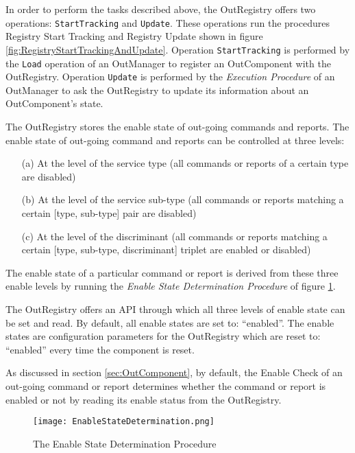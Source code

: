 In order to perform the tasks described above, the OutRegistry offers two operations: \texttt{StartTracking} and \texttt{Update}. These operations run the procedures Registry Start Tracking and Registry Update shown in figure \ref{fig:RegistryStartTrackingAndUpdate}. Operation \texttt{StartTracking} is performed by the \texttt{Load} operation of an OutManager to register an OutComponent with the OutRegistry. Operation \texttt{Update} is performed by the \textit{Execution Procedure} of an OutManager to ask the OutRegistry to update its information about an OutComponent's state.

The OutRegistry stores the enable state of out-going commands and reports. The enable state of out-going command and reports can be controlled at three levels: 
\begin{itemize}
\item[(a)] At the level of the service type (all commands or reports of a certain type are disabled)
\item[(b)] At the level of the service sub-type (all commands or reports matching a certain [type, sub-type] pair are disabled)
\item[(c)] At the level of the discriminant (all commands or reports matching a certain [type, sub-type, discriminant] triplet are enabled or disabled)
\end{itemize}
The enable state of a particular command or report is derived from these three enable levels by running the \textit{Enable State Determination Procedure} of figure \ref{fig:EnableStateDetermination}.

The OutRegistry offers an API through which all three levels of enable state can be set and read. By default, all enable states are set to: “enabled”. The enable states are configuration parameters for the OutRegistry which are reset to: “enabled” every time the component is reset.

As discussed in section \ref{sec:OutComponent}, by default, the Enable Check of an out-going command or report determines whether the command or report is enabled or not by reading its enable status from the OutRegistry. 

\begin{figure}[H]
 \centering
 \texttt{[image: EnableStateDetermination.png]}
 \caption{The Enable State Determination Procedure}
 \label{fig:EnableStateDetermination}
\end{figure}

